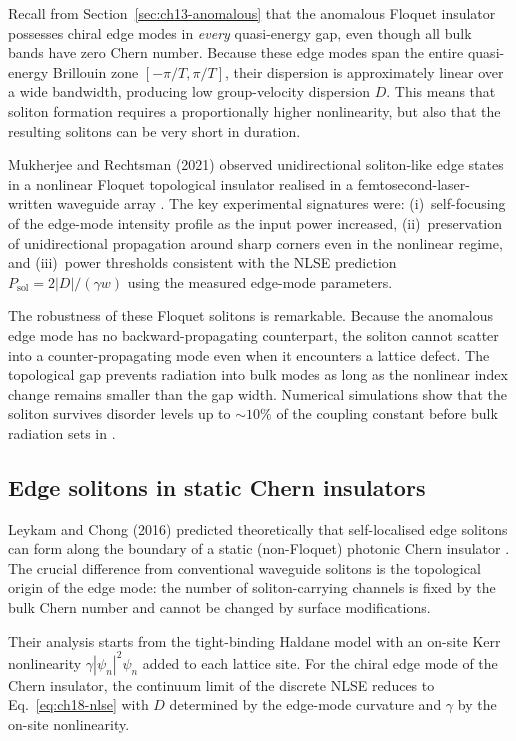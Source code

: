 Recall from Section~\ref{sec:ch13-anomalous} that the anomalous
Floquet insulator possesses chiral edge modes in \emph{every}
quasi-energy gap, even though all bulk bands have zero Chern number.
Because these edge modes span the entire quasi-energy Brillouin zone
$[-\pi/T,\pi/T]$, their dispersion is approximately linear over a
wide bandwidth, producing low group-velocity dispersion $D$.  This
means that soliton formation requires a proportionally higher
nonlinearity, but also that the resulting solitons can be very short
in duration.

Mukherjee and Rechtsman (2021) observed unidirectional soliton-like
edge states in a nonlinear Floquet topological insulator realised in
a femtosecond-laser-written waveguide array
\cite{mukherjee2021observation}.  The key experimental signatures
were: (i)~self-focusing of the edge-mode intensity profile as the
input power increased, (ii)~preservation of unidirectional propagation
around sharp corners even in the nonlinear regime, and (iii)~power
thresholds consistent with the NLSE prediction $P_{\mathrm{sol}} =
2|D|/(\gamma w)$ using the measured edge-mode parameters.

The robustness of these Floquet solitons is remarkable.  Because the
anomalous edge mode has no backward-propagating counterpart, the
soliton cannot scatter into a counter-propagating mode even when it
encounters a lattice defect.  The topological gap prevents radiation
into bulk modes as long as the nonlinear index change remains smaller
than the gap width.  Numerical simulations show that the soliton
survives disorder levels up to $\sim 10\%$ of the coupling constant
before bulk radiation sets in \cite{shen2023floquet}.

\subsection{Edge solitons in static Chern insulators}
\label{sec:ch18-static-solitons}

Leykam and Chong (2016) predicted theoretically that self-localised
edge solitons can form along the boundary of a static (non-Floquet)
photonic Chern insulator \cite{leykam2016edge}.  The crucial
difference from conventional waveguide solitons is the topological
origin of the edge mode: the number of soliton-carrying channels is
fixed by the bulk Chern number and cannot be changed by surface
modifications.

Their analysis starts from the tight-binding Haldane model with
an on-site Kerr nonlinearity $\gamma|\psi_n|^2\psi_n$ added to each
lattice site.  For the chiral edge mode of the Chern insulator,
the continuum limit of the discrete NLSE reduces to
Eq.~\eqref{eq:ch18-nlse} with $D$ determined by the edge-mode
curvature and $\gamma$ by the on-site nonlinearity.

